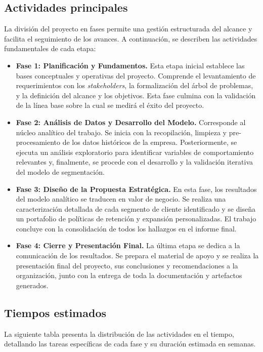 \subsection{Actividades principales} %
La división del proyecto en fases permite una gestión estructurada del alcance y facilita el seguimiento de los avances. A continuación, se describen las actividades fundamentales de cada etapa:

\begin{itemize}
    \item \textbf{Fase 1: Planificación y Fundamentos.} Esta etapa inicial establece las bases conceptuales y operativas del proyecto. Comprende el levantamiento de requerimientos con los \textit{stakeholders}, la formalización del árbol de problemas, y la definición del alcance y los objetivos. Esta fase culmina con la validación de la línea base sobre la cual se medirá el éxito del proyecto.

    \item \textbf{Fase 2: Análisis de Datos y Desarrollo del Modelo.} Corresponde al núcleo analítico del trabajo. Se inicia con la recopilación, limpieza y pre-procesamiento de los datos históricos de la empresa. Posteriormente, se ejecuta un análisis exploratorio para identificar variables de comportamiento relevantes y, finalmente, se procede con el desarrollo y la validación iterativa del modelo de segmentación.

    \item \textbf{Fase 3: Diseño de la Propuesta Estratégica.} En esta fase, los resultados del modelo analítico se traducen en valor de negocio. Se realiza una caracterización detallada de cada segmento de cliente identificado y se diseña un portafolio de políticas de retención y expansión personalizadas. El trabajo concluye con la consolidación de todos los hallazgos en el informe final.

    \item \textbf{Fase 4: Cierre y Presentación Final.} La última etapa se dedica a la comunicación de los resultados. Se prepara el material de apoyo y se realiza la presentación final del proyecto, sus conclusiones y recomendaciones a la organización, junto con la entrega de toda la documentación y artefactos generados.
\end{itemize}

\subsection{Tiempos estimados}
La siguiente tabla presenta la distribución de las actividades en el tiempo, detallando las tareas específicas de cada fase y su duración estimada en semanas.

